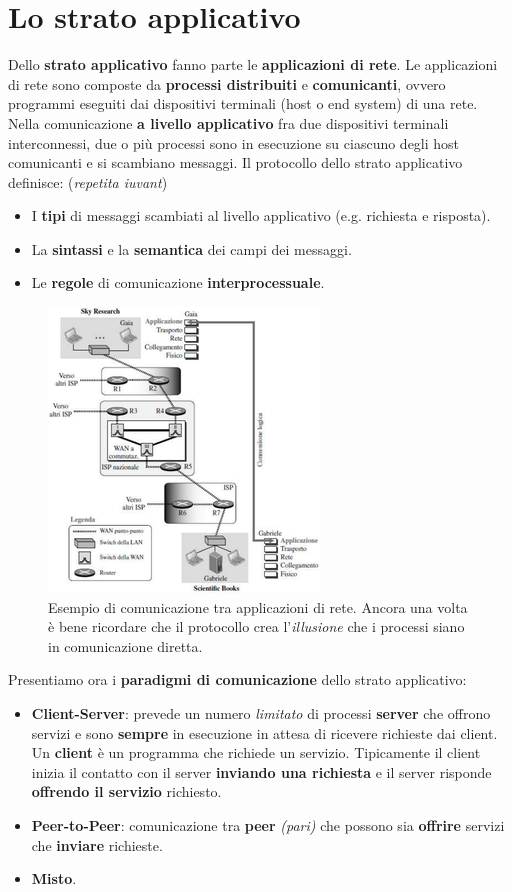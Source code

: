 \documentclass[11pt,a4paper,oneside]{book}
\theoremstyle{definition}
\begin{document}
\section{Lo strato applicativo}
Dello \textbf{strato applicativo} fanno parte le \textbf{applicazioni di rete}. Le applicazioni di rete sono composte da \textbf{processi distribuiti} e \textbf{comunicanti}, ovvero programmi eseguiti dai dispositivi terminali (host o end system) di una rete. Nella comunicazione \textbf{a livello applicativo} fra due dispositivi terminali interconnessi, due o più processi sono in esecuzione su ciascuno degli host comunicanti e si scambiano messaggi.
Il protocollo dello strato applicativo definisce: (\textit{repetita iuvant})
\begin{itemize}
	\item I \textbf{tipi} di messaggi scambiati al livello
	      applicativo (e.g. richiesta e risposta).
	\item La \textbf{sintassi} e la \textbf{semantica} dei campi dei messaggi.
	\item Le \textbf{regole} di comunicazione \textbf{interprocessuale}.
\end{itemize}
\begin{figure}[!h]
	\includegraphics[scale=0.63]{Immagini/Application_layer.png}
	\centering
	\caption{Esempio di comunicazione tra applicazioni di rete. Ancora una volta è bene ricordare che il protocollo crea l'\textit{illusione} che i processi siano in comunicazione diretta.}
\end{figure}
Presentiamo ora i \textbf{paradigmi di comunicazione} dello strato applicativo:
\begin{itemize}
	\item \textbf{Client-Server}: prevede un numero \textit{limitato} di processi \textbf{server} che
	      offrono servizi e sono \textbf{sempre} in esecuzione in attesa di ricevere richieste dai client. Un \textbf{client} è un programma che richiede un servizio. Tipicamente il client inizia il contatto con il server \textbf{inviando una richiesta} e il server risponde \textbf{offrendo il servizio} richiesto.
	\item \textbf{Peer-to-Peer}: comunicazione tra \textbf{peer} \textit{(pari)} che possono sia \textbf{offrire} servizi che \textbf{inviare} richieste.
	\item  \textbf{Misto}.
\end{itemize}
\end{document}
